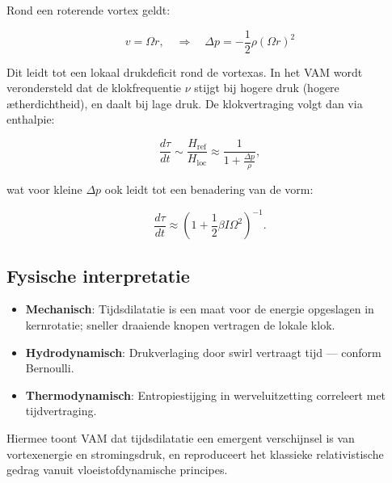 Rond een roterende vortex geldt:

\[
v = \Omega r, \quad \Rightarrow \quad \Delta p = -\frac{1}{2} \rho (\Omega r)^2
\]

Dit leidt tot een lokaal drukdeficit rond de vortexas. In het VAM wordt verondersteld dat de klokfrequentie $\nu$ stijgt bij hogere druk (hogere ætherdichtheid), en daalt bij lage druk. De klokvertraging volgt dan via enthalpie:

\begin{equation}
\frac{d\tau}{dt} \sim \frac{H_\text{ref}}{H_\text{loc}} \approx \frac{1}{1 + \frac{\Delta p}{\rho}},
\end{equation}

wat voor kleine $\Delta p$ ook leidt tot een benadering van de vorm:

\begin{equation}
\frac{d\tau}{dt} \approx \left(1 + \frac{1}{2} \beta I \Omega^2 \right)^{-1}.
\end{equation}

\subsection{Fysische interpretatie}

\begin{itemize}
    \item \textbf{Mechanisch}: Tijdsdilatatie is een maat voor de energie opgeslagen in kernrotatie; sneller draaiende knopen vertragen de lokale klok.
    \item \textbf{Hydrodynamisch}: Drukverlaging door swirl vertraagt tijd — conform Bernoulli.
    \item \textbf{Thermodynamisch}: Entropiestijging in werveluitzetting correleert met tijdvertraging.
\end{itemize}

Hiermee toont VAM dat tijdsdilatatie een emergent verschijnsel is van vortexenergie en stromingsdruk, en reproduceert het klassieke relativistische gedrag vanuit vloeistofdynamische principes.

